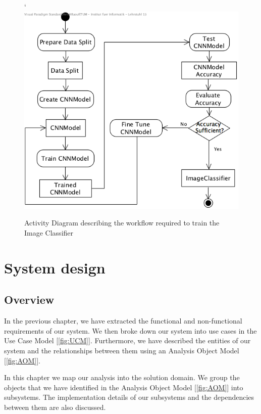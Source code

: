 \documentclass[a4paper,12pt,twoside]{report}
\begin{document}
\begin{figure}[h]
\centering`
  \includegraphics[width=\textwidth]{AD2}
\caption{Activity Diagram describing the workflow required to train the Image Classifier}
\label{fig:AD2}
\end{figure}










\chapter{System design}

\section{Overview}

In the previous chapter, we have extracted the functional and non-functional requirements of our system. We then broke down our system into use cases in the Use Case Model [\ref{fig:UCM}]. Furthermore, we have described the entities of our system and the relationships between them using an Analysis Object Model [\ref{fig:AOM}].

In this chapter we map our analysis into the solution domain. We group the objects that we have identified in the Analysis Object Model [\ref{fig:AOM}] into subsystems. The implementation details of our subsystems and the dependencies between them are also discussed.
\end{document}
